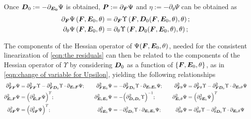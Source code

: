 Once $\boldsymbol{D}_0:=-\partial_{\boldsymbol{E_0}}\Psi$ is obtained, $\boldsymbol{P}:=\partial_{\boldsymbol{F}}\Psi$ and $\eta:=-\partial_{\theta}\Psi$ can be obtained as
%
\begin{equation}
	\begin{aligned}
	\partial_{\boldsymbol{F}}\Psi\left(\boldsymbol{F},\boldsymbol{E}_0,\theta\right)&=\partial_{\boldsymbol{F}}\Upsilon\left(\boldsymbol{F},\boldsymbol{D}_0(\boldsymbol{F},\boldsymbol{E}_0,\theta),\theta\right);\\
	\partial_{\theta}\Psi\left(\boldsymbol{F},\boldsymbol{E}_0,\theta\right)&=\partial_{\theta}\Upsilon\left(\boldsymbol{F},\boldsymbol{D}_0(\boldsymbol{F},\boldsymbol{E}_0,\theta),\theta\right);
	\end{aligned}
\end{equation}

The components of the Hessian operator of $\Psi(\boldsymbol{F},\boldsymbol{E}_0,\theta)$, needed for the consistent linearization of \eqref{eqn:the residuals} can then be related to the components of the Hessian operator of $\Upsilon$ by considering $\boldsymbol{D}_0$ as a function of $\{\boldsymbol{F},\boldsymbol{E}_0,\theta\}$, as in \eqref{eqn:change of variable for Upsilon}, yielding the following relationships
%
\begin{equation}
	\begin{aligned}
\partial^2_{\vect{F}\vect{F}}\Psi & =  \partial^2_{\vect{F}\vect{F}}\Upsilon - 
\partial^2_{\vect{F}\vect{D}_0}\Upsilon \cdot \partial_{\vect{E}_0\vect{F}}\Psi;&\quad
%
\partial^2_{\vect{F}\vect{E}_0}\Psi & = 
-\partial^2_{\vect{F}\vect{D}_0}\Upsilon \cdot \partial_{\vect{E}_0\vect{E}_0}\Psi;&\quad
%
\partial^2_{\vect{F}\theta}\Psi & = 
\partial^2_{\vect{F}\theta}\Upsilon
-\partial^2_{\vect{F}\vect{D}_0}\Upsilon\cdot\partial_{\vect{E}_0\theta}\Psi\\
%
%
\partial^2_{\vect{E}_0\vect{F}}\Psi & =  \Big(\partial^2_{\vect{E}_0\vect{F}}\Psi\Big)^T;&\quad
%
\partial^2_{\vect{E}_0\vect{E}_0}\Psi & = -
\Big(\partial^2_{\vect{D}_0\vect{D}_0}\Upsilon\Big)^{-1};&\quad
%
\partial^2_{\vect{E}_0\theta}\Psi & = 
\Big(\partial^2_{\theta\vect{E}_0}\Psi\Big)^T\\
%
%
%
\partial^2_{\theta\vect{F}}\Psi & =\Big(\partial^2_{\theta\vect{F}}\Psi\Big)^T;&\quad
%
\partial^2_{\theta\vect{E}_0}\Psi & = -\partial^2_{\theta\vect{D}_0}\Upsilon\cdot\partial_{\vect{E}_0\vect{E}_0}\Psi ;&\quad
%
\partial^2_{\theta\theta}\Psi & =\partial^2_{\theta\theta}\Upsilon- \partial^2_{\theta\vect{D}_0}\Upsilon\cdot\partial_{\vect{E}_0\theta}\Psi 
%
	\end{aligned}
\end{equation}


